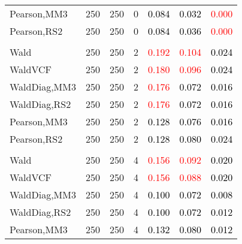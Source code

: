 \documentclass[
]{article}
\begin{document}
\begin{table}[H]
{\begin{tabular}[t]{lrrrrrr}
\hspace{1em}Pearson,MM3 & 250 & 250 & 0 & \textcolor{black}{0.084} & \textcolor{black}{0.032} & \textcolor{red}{0.000}\\
\hspace{1em}Pearson,RS2 & 250 & 250 & 0 & \textcolor{black}{0.084} & \textcolor{black}{0.036} & \textcolor{red}{0.000}\\
\addlinespace[0.3em]
\multicolumn{7}{l}{\textbf{1F 15V}}\\
\hspace{1em}Wald & 250 & 250 & 2 & \textcolor{red}{0.192} & \textcolor{red}{0.104} & \textcolor{black}{0.024}\\
\hspace{1em}WaldVCF & 250 & 250 & 2 & \textcolor{red}{0.180} & \textcolor{red}{0.096} & \textcolor{black}{0.024}\\
\hspace{1em}WaldDiag,MM3 & 250 & 250 & 2 & \textcolor{red}{0.176} & \textcolor{black}{0.072} & \textcolor{black}{0.016}\\
\hspace{1em}WaldDiag,RS2 & 250 & 250 & 2 & \textcolor{red}{0.176} & \textcolor{black}{0.072} & \textcolor{black}{0.016}\\
\hspace{1em}Pearson,MM3 & 250 & 250 & 2 & \textcolor{black}{0.128} & \textcolor{black}{0.076} & \textcolor{black}{0.016}\\
\hspace{1em}Pearson,RS2 & 250 & 250 & 2 & \textcolor{black}{0.128} & \textcolor{black}{0.080} & \textcolor{black}{0.024}\\
\addlinespace[0.3em]
\multicolumn{7}{l}{\textbf{2F 10V}}\\
\hspace{1em}Wald & 250 & 250 & 4 & \textcolor{red}{0.156} & \textcolor{red}{0.092} & \textcolor{black}{0.020}\\
\hspace{1em}WaldVCF & 250 & 250 & 4 & \textcolor{red}{0.156} & \textcolor{red}{0.088} & \textcolor{black}{0.020}\\
\hspace{1em}WaldDiag,MM3 & 250 & 250 & 4 & \textcolor{black}{0.100} & \textcolor{black}{0.072} & \textcolor{black}{0.008}\\
\hspace{1em}WaldDiag,RS2 & 250 & 250 & 4 & \textcolor{black}{0.100} & \textcolor{black}{0.072} & \textcolor{black}{0.012}\\
\hspace{1em}Pearson,MM3 & 250 & 250 & 4 & \textcolor{black}{0.132} & \textcolor{black}{0.080} & \textcolor{black}{0.012}\\

\end{tabular}}
\end{table}
\end{document}
